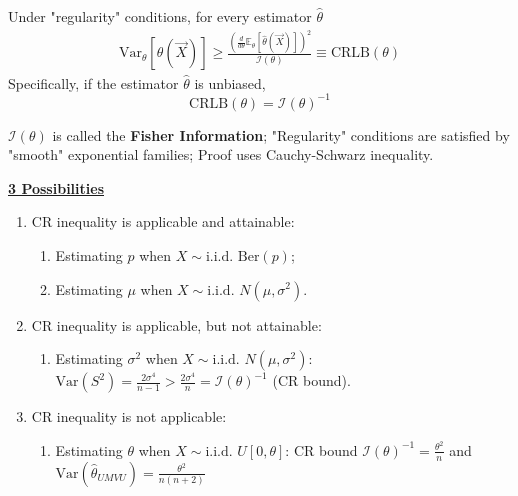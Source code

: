 \documentclass[11pt]{elegantbook}
\begin{document}
\begin{proposition}
    Under "regularity" conditions, for every estimator $\hat{\theta}$
    \begin{equation}
        \begin{aligned}
            \text{Var}_\theta[\hat{\theta}(\vec{X})]\geq \frac{\left(\frac{d}{d\theta}\mathbb{E}_\theta[\hat{\theta}(\vec{X})]\right)^2}{\mathcal{I}(\theta)}\equiv \text{CRLB}(\theta)
        \end{aligned}
        \nonumber
    \end{equation}
    Specifically, if the estimator $\hat{\theta}$ is unbiased, $$\text{CRLB}(\theta)=\mathcal{I}(\theta)^{-1}$$
\end{proposition}
\begin{remark}
    $\mathcal{I}(\theta)$ is called the \textbf{Fisher Information}; "Regularity" conditions are satisfied by "smooth" exponential families; Proof uses Cauchy-Schwarz inequality.
\end{remark}
\textbf{\underline{3 Possibilities}}
\begin{enumerate}[(1).]
    \item CR inequality is applicable and attainable:
    \begin{enumerate}
        \item Estimating $p$ when $X\sim \text{i.i.d. Ber}(p)$;
        \item Estimating $\mu$ when $X\sim \text{i.i.d. } N(\mu,\sigma^2)$.
    \end{enumerate}
    \item CR inequality is applicable, but not attainable:
    \begin{enumerate}
        \item Estimating $\sigma^2$ when $X\sim \text{i.i.d. } N(\mu,\sigma^2)$: $\text{Var}(S^2)=\frac{2\sigma^4}{n-1}>\frac{2\sigma^4}{n}=\mathcal{I}(\theta)^{-1}$ (CR bound).
    \end{enumerate}
    \item CR inequality is not applicable:
    \begin{enumerate}
        \item Estimating $\theta$ when $X\sim \text{i.i.d. }U[0,\theta]$: CR bound $\mathcal{I}(\theta)^{-1}=\frac{\theta^2}{n}$ and $\text{Var}(\hat{\theta}_{UMVU})=\frac{\theta^2}{n(n+2)}$
    \end{enumerate}
\end{enumerate}
\end{document}
